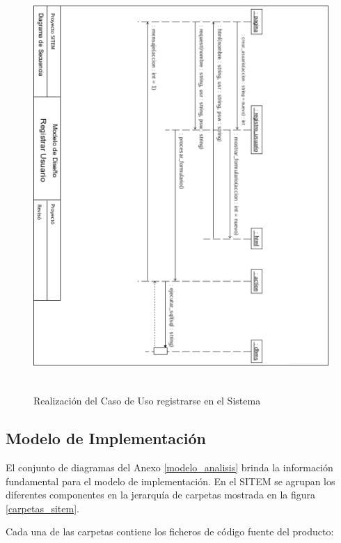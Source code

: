 \begin{figure}
 \centering
 \includegraphics[width=156mm, height=156mm]{secuencia.png}
 \caption{Realización del Caso de Uso registrarse en el Sistema}
 \label{secuencia}
\end{figure}


\subsection{Modelo de Implementación}

El conjunto de diagramas del Anexo \ref{modelo_analisis} brinda la información fundamental para el modelo de implementación. En el SITEM se agrupan los diferentes componentes en la jerarquía de carpetas mostrada en la figura \ref{carpetas_sitem}.

Cada una de las carpetas contiene los ficheros de código fuente del producto:

